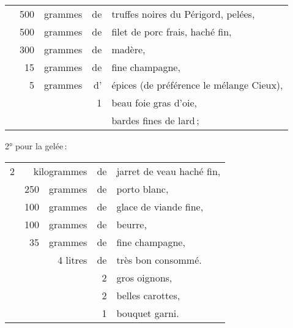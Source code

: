 \footnotesize
\begin{longtable}{rrrrp{18em}}
  & 500 & grammes & de & truffes noires du Périgord, pelées,                                              \\
  & 500 & grammes & de & filet de porc frais, haché fin,                                                  \\
  & 300 & grammes & de & madère,                                                                          \\
  &  15 & grammes & de & fine champagne,                                                                  \\
  &   5 & grammes & d' & épices (de préférence le mélange Cieux),                                         \\
  &     &         &  1 & beau foie gras d'oie,                                                            \\
  &     &         &    & bardes fines de lard ;                                                           \\
\end{longtable}
\normalsize


2° pour la gelée :

\footnotesize
\begin{longtable}{rrrrp{18em}}
  2 &  \multicolumn{2}{r}{kilogrammes} & de & jarret de veau haché fin,                                   \\
  & 250 & grammes  & de & porto blanc,                                                                    \\
  & 100 & grammes  & de & glace de viande fine,                                                           \\
  & 100 & grammes  & de & beurre,                                                                         \\
  &  35 & grammes  & de & fine champagne,                                                                 \\
  &     & 4 litres & de & très bon consommé.                                                              \\
  &     &          &  2 & gros oignons,                                                                   \\
  &     &          &  2 & belles carottes,                                                                \\
  &     &          &  1 & bouquet garni.                                                                  \\
\end{longtable}
\normalsize

